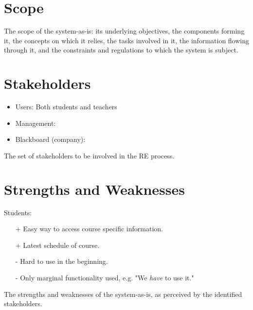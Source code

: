 \section{Scope}
The scope of the system-as-is: its underlying objectives, the components forming it, the
concepts on which it relies, the tasks involved in it, the information flowing through it,
and the constraints and regulations to which the system is subject.

\section{Stakeholders}
\begin{itemize}
	\item Users: Both students and teachers
	\item Management:
	\item Blackboard (company):
\end{itemize}

The set of stakeholders to be involved in the RE process.

\section{Strengths and Weaknesses}
Students:
\begin{itemize}
	\item[+] Easy way to access course specific information.
	\item[+] Latest schedule of course.
	\item[-] Hard to use in the beginning.
	\item[-] Only marginal functionality used, e.g. "We \textit{have} to use it."
\end{itemize}

The strengths and weaknesses of the system-as-is, as perceived by the identified stakeholders.

